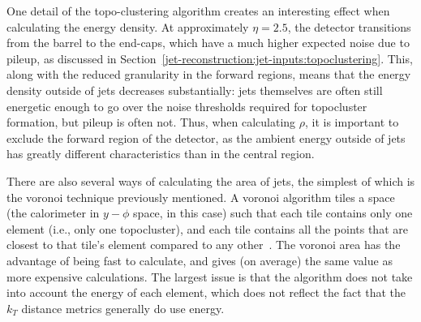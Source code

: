 One detail of the topo-clustering algorithm creates an interesting effect when calculating the energy density. At approximately $\eta = 2.5$, the detector transitions from the barrel to the end-caps, which have a much higher expected noise due to pileup, as discussed in Section~\ref{jet-reconstruction:jet-inputs:topoclustering}. This, along with the reduced granularity in the forward regions, means that the energy density outside of jets decreases substantially: jets themselves are often still energetic enough to go over the noise thresholds required for topocluster formation, but pileup is often not. Thus, when calculating $\rho$, it is important to exclude the forward region of the detector, as the ambient energy outside of jets has greatly different characteristics than in the central region.

There are also several ways of calculating the area of jets, the simplest of which is the voronoi technique previously mentioned. A voronoi algorithm tiles a space (the calorimeter in $y-\phi$ space, in this case) such that each tile contains only one element (i.e., only one topocluster), and each tile contains all the points that are closest to that tile's element compared to any other~\cite{catchmentarea}. The voronoi area has the advantage of being fast to calculate, and gives (on average) the same value as more expensive calculations. The largest issue is that the algorithm does not take into account the energy of each element, which does not reflect the fact that the $k_T$ distance metrics generally do use energy.

